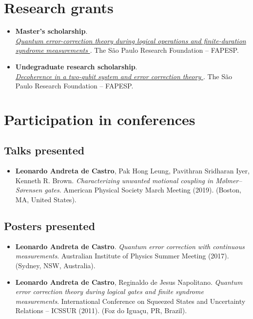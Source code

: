 \documentclass[a4paper]{article}
\begin{document}
\section*{Research grants}
\begin{itemize} \item[]   \textbf{Master's scholarship}. \href{https://bv.fapesp.br/en/bolsas/112279/quantum-error-correction-theory-during-logical-operations-and-finite-duration-syndrome-measurements}{
 \\ \makebox[2cm]{} \textit{Quantum error-correction theory during logical operations and finite-duration 
 \\ \makebox[2cm]{} syndrome measurements} }. The São Paulo Research Foundation – FAPESP.  
\item[]   \textbf{Undegraduate research scholarship}. \href{https://bv.fapesp.br/en/bolsas/71743/decoherence-in-a-two-qubit-system-and-error-correction-theory/}{
 \\ \makebox[2cm]{} \textit{Decoherence in a two-qubit system and error correction theory} }. The São Paulo Research Foundation – FAPESP.  
 \end{itemize}\section*{Participation in conferences}
\subsection*{Talks presented}
\begin{itemize} \item[]  \textbf{Leonardo Andreta de Castro}, Pak Hong Leung, Pavithran Sridharan Iyer, Kenneth R. Brown. \textit{Characterizing unwanted motional coupling in Mølmer–Sørensen gates}.  American Physical Society March Meeting (2019). (Boston, MA, United States).   \end{itemize}
\subsection*{Posters presented}
\begin{itemize} \item[]  \textbf{Leonardo Andreta de Castro}. \textit{Quantum error correction with continuous measurements}.  Australian Institute of Physics Summer Meeting (2017). (Sydney, NSW, Australia).  
\item[]  \textbf{Leonardo Andreta de Castro}, Reginaldo de Jesus Napolitano. \textit{Quantum error correction theory during logical gates and finite syndrome measurements}.  International Conference on Squeezed States and Uncertainty Relations – ICSSUR (2011). (Foz do Iguaçu, PR, Brazil).  
 \end{itemize}
\end{document}
